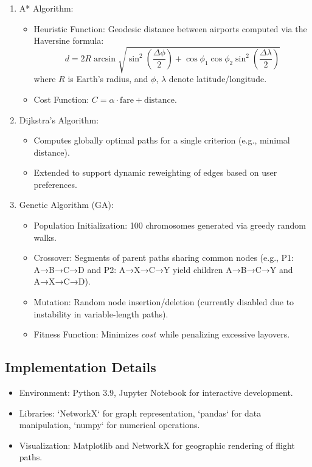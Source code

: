 \documentclass[conference]{IEEEtran}
\begin{document}
\begin{enumerate}
    \item A* Algorithm:  
        \begin{itemize}
            \item Heuristic Function: Geodesic distance between airports computed via the Haversine formula:  
              \[
              d = 2R \arcsin\sqrt{\sin^2\left(\frac{\Delta\phi}{2}\right) + \cos\phi_1 \cos\phi_2 \sin^2\left(\frac{\Delta\lambda}{2}\right)}
              \]  
              where \(R\) is Earth's radius, and \(\phi\), \(\lambda\) denote latitude/longitude.  
            \item Cost Function: \(C = \alpha \cdot \text{fare} + \text{distance}\).  
        \end{itemize}
    
    \item Dijkstra's Algorithm:  
        \begin{itemize}
            \item Computes globally optimal paths for a single criterion (e.g., minimal distance).  
            \item Extended to support dynamic reweighting of edges based on user preferences.  
        \end{itemize}
    
    \item Genetic Algorithm (GA):  
        \begin{itemize}
            \item Population Initialization: 100 chromosomes generated via greedy random walks.  
            \item Crossover: Segments of parent paths sharing common nodes (e.g., P1: A→B→C→D and P2: A→X→C→Y yield children A→B→C→Y and A→X→C→D).  
            \item Mutation: Random node insertion/deletion (currently disabled due to instability in variable-length paths).  
            \item Fitness Function: Minimizes \(cost\) while penalizing excessive layovers.  
        \end{itemize}
\end{enumerate}

\subsection{Implementation Details}
\begin {itemize}
    \item Environment: Python 3.9, Jupyter Notebook for interactive development.  
    \item Libraries: `NetworkX` for graph representation, `pandas` for data manipulation, `numpy` for numerical operations.  
    \item Visualization: Matplotlib and NetworkX for geographic rendering of flight paths.
\end{itemize}  
\end{document}

